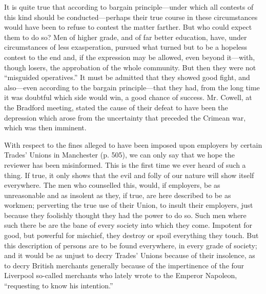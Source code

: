 It is quite true that according to bargain principle---under which all
contests of this kind should be conducted---perhaps their true course in
these circumstances would have been to refuse to contest the matter
farther. But who could expect them to do so? Men of higher grade, and of
far better education, have, under circumstances of less exasperation,
pursued what turned but to be a hopeless contest to the end and, if the
expression may be allowed, even beyond it---with, though losers, the
approbation of the whole community. But then they were not ``misguided
operatives.'' It must be admitted that they showed good fight, and
also---even according to the bargain principle---that they had, from the
long time it was doubtful which side would win, a good chance of
success. Mr. Cowell, at the Bradford meeting, stated the cause of their
defeat to have been the depression which arose from the uncertainty that
preceded the Crimean war, which was then imminent.

With respect to the fines alleged to have been imposed upon employers by
certain Trades' Unions in Manchester (p. 505), we can only say that we
hope the reviewer has been misinformed. This is the first time we ever
heard of such a thing. If true, it only shows that the evil and folly of
our nature will show itself everywhere. The men who counselled this,
would, if employers, be as unreasonable and as insolent as they, if
true, are here described to be as workmen; perverting the true use of
their Union, to insult their employers, just because they foolishly
thought they had the power to do so. Such men where such there be are
the bane of every society into which they come. Impotent for good, but
powerful for mischief, they destroy or spoil everything they touch. But
this description of persons are to be found everywhere, in every grade
of society; and it would be as unjust to decry Trades' Unions because of
their insolence, as to decry British merchants generally because of the
impertinence of the four Liverpool so-called merchants who lately wrote
to the Emperor Napoleon, ``requesting to know his intention.''